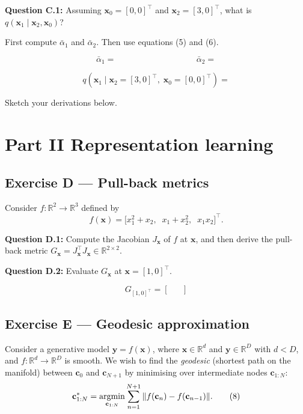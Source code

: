 \documentclass[12pt,a4paper]{article}
\begin{document}
\textbf{Question C.1:} Assuming $\mathbf{x}_0=[0,0]^\top$ and $\mathbf{x}_2=[3,0]^\top$,
what is $q(\mathbf{x}_1\mid\mathbf{x}_2,\mathbf{x}_0)$?

First compute $\bar\alpha_1$ and $\bar\alpha_2$.  Then use equations (5) and (6).

\vspace{2cm}

\[
  \bar\alpha_1 = \hspace{4cm} \bar\alpha_2 =
\]

\vspace{2cm}

\[
  q(\mathbf{x}_1\mid\mathbf{x}_2=[3,0]^\top,\;\mathbf{x}_0=[0,0]^\top) =
\]

Sketch your derivations below.

\vspace{5cm}

\newpage
\section*{Part II \quad Representation learning}

\subsection*{Exercise D --- Pull-back metrics}

Consider $f:\mathbb{R}^2\to\mathbb{R}^3$ defined by
\[
  f(\mathbf{x}) = \bigl[x_1^2+x_2,\;\; x_1+x_2^2,\;\; x_1 x_2\bigr]^\top. \tag{7}
\]

\textbf{Question D.1:} Compute the Jacobian $J_{\mathbf{x}}$ of $f$ at $\mathbf{x}$, and then
derive the pull-back metric $G_{\mathbf{x}} = J_{\mathbf{x}}^\top J_{\mathbf{x}}\in\mathbb{R}^{2\times 2}$.

\vspace{7cm}

\textbf{Question D.2:} Evaluate $G_{\mathbf{x}}$ at $\mathbf{x}=[1,0]^\top$.

\[
  G_{[1,0]^\top} =
  \begin{bmatrix} & \\ & \end{bmatrix}
\]

\newpage
\subsection*{Exercise E --- Geodesic approximation}

Consider a generative model $\mathbf{y}=f(\mathbf{x})$, where $\mathbf{x}\in\mathbb{R}^d$ and
$\mathbf{y}\in\mathbb{R}^D$ with $d<D$, and $f:\mathbb{R}^d\to\mathbb{R}^D$ is smooth.  We wish to
find the \emph{geodesic} (shortest path on the manifold) between $\mathbf{c}_0$ and
$\mathbf{c}_{N+1}$ by minimising over intermediate nodes $\mathbf{c}_{1:N}$:
\[
  \mathbf{c}^*_{1:N} = \operatornamewithlimits{argmin}_{\mathbf{c}_{1:N}}
    \sum_{n=1}^{N+1} \|f(\mathbf{c}_n)-f(\mathbf{c}_{n-1})\|. \tag{8}
\]
\end{document}
